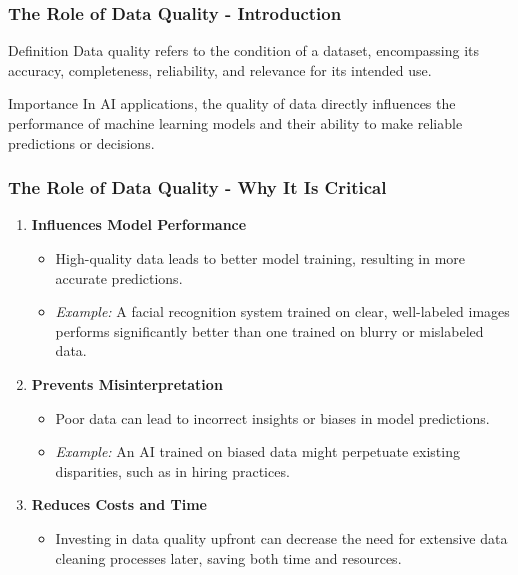 \documentclass[aspectratio=169]{beamer}
\begin{document}
\begin{frame}[fragile]
    \frametitle{The Role of Data Quality - Introduction}
    \begin{block}{Definition}
        Data quality refers to the condition of a dataset, encompassing its accuracy, completeness, reliability, and relevance for its intended use.
    \end{block}
    
    \begin{block}{Importance}
        In AI applications, the quality of data directly influences the performance of machine learning models and their ability to make reliable predictions or decisions.
    \end{block}
\end{frame}

\begin{frame}[fragile]
    \frametitle{The Role of Data Quality - Why It Is Critical}
    \begin{enumerate}
        \item \textbf{Influences Model Performance}
            \begin{itemize}
                \item High-quality data leads to better model training, resulting in more accurate predictions.
                \item \textit{Example:} A facial recognition system trained on clear, well-labeled images performs significantly better than one trained on blurry or mislabeled data.
            \end{itemize}

        \item \textbf{Prevents Misinterpretation}
            \begin{itemize}
                \item Poor data can lead to incorrect insights or biases in model predictions.
                \item \textit{Example:} An AI trained on biased data might perpetuate existing disparities, such as in hiring practices.
            \end{itemize}

        \item \textbf{Reduces Costs and Time}
            \begin{itemize}
                \item Investing in data quality upfront can decrease the need for extensive data cleaning processes later, saving both time and resources.
            \end{itemize}
    \end{enumerate}
\end{frame}
\end{document}
